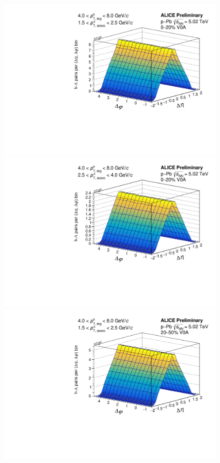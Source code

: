 \begin{figure}[ht]
	\centering
	\begin{minipage}{0.48\textwidth}
		\includegraphics[width=\textwidth]{figures/analysis/h_lambda_2d_mixed_fancy_label_0_20_lowpt.pdf}
	\end{minipage}
	\begin{minipage}{0.48\textwidth}
		\includegraphics[width=\textwidth]{figures/analysis/h_lambda_2d_mixed_fancy_label_0_20_highpt.pdf}
	\end{minipage}
	\begin{minipage}{0.48\textwidth}
		\includegraphics[width=\textwidth]{figures/analysis/h_lambda_2d_mixed_fancy_label_20_50_lowpt.pdf}

\end{minipage}
\end{figure}
